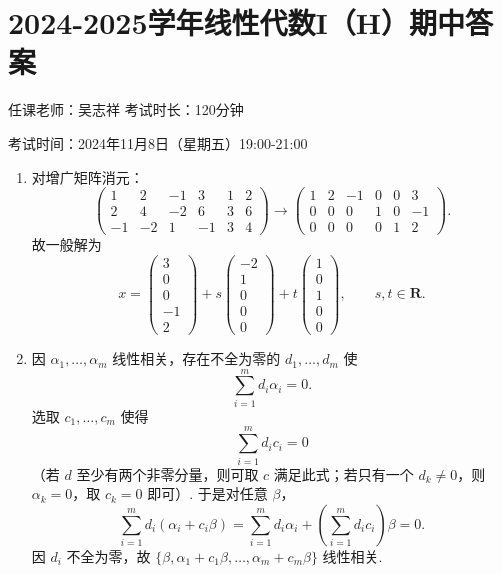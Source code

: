 \section{2024-2025学年线性代数I（H）期中答案}

\begin{center}
    任课老师：吴志祥\hspace{4em} 考试时长：120分钟

    考试时间：2024年11月8日（星期五）19:00-21:00
\end{center}
\begin{enumerate}
    \item 对增广矩阵消元：
    \[
        \left(\begin{array}{ccccc|c}
            1&2&-1&3&1&2\\
            2&4&-2&6&3&6\\
            -1&-2&1&-1&3&4
        \end{array}\right)
        \longrightarrow
        \left(\begin{array}{ccccc|c}
            1&2&-1&0&0&3\\
            0&0&0&1&0&-1\\
            0&0&0&0&1&2
        \end{array}\right).
    \]
    故一般解为
    \[
        x=\begin{pmatrix}3\\0\\0\\-1\\2\end{pmatrix}
        +s\begin{pmatrix}-2\\1\\0\\0\\0\end{pmatrix}
        +t\begin{pmatrix}1\\0\\1\\0\\0\end{pmatrix},
        \qquad s,t\in\mathbf{R}.
    \]

    \item 因 $\alpha_1,\ldots,\alpha_m$ 线性相关，存在不全为零的 $d_1,\ldots,d_m$ 使
    \[
        \sum_{i=1}^md_i\alpha_i=0.
    \]
    选取 $c_1,\ldots,c_m$ 使得
    \[
        \sum_{i=1}^md_ic_i=0
    \]
    （若 $d$ 至少有两个非零分量，则可取 $c$ 满足此式；若只有一个 $d_k\neq 0$，则 $\alpha_k=0$，取 $c_k=0$ 即可）. 于是对任意 $\beta$，
    \[
        \sum_{i=1}^md_i(\alpha_i+c_i\beta)
        =\sum_{i=1}^md_i\alpha_i+\left(\sum_{i=1}^md_ic_i\right)\beta=0.
    \]
    因 $d_i$ 不全为零，故 $\{\beta,\alpha_1+c_1\beta,\ldots,\alpha_m+c_m\beta\}$ 线性相关.


\end{enumerate}
